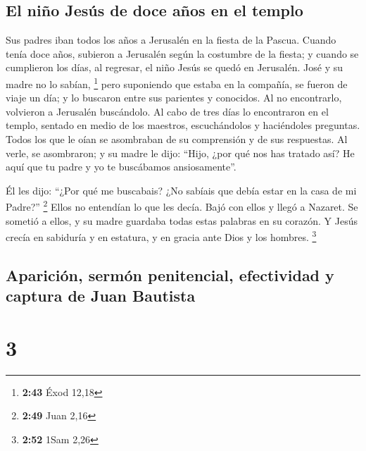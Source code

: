 \hypertarget{el-niuxf1o-jesuxfas-de-doce-auxf1os-en-el-templo}{%
\subsection{El niño Jesús de doce años en el
templo}\label{el-niuxf1o-jesuxfas-de-doce-auxf1os-en-el-templo}}

 Sus padres iban todos los años a Jerusalén en la fiesta
de la Pascua.  Cuando tenía doce años, subieron a
Jerusalén según la costumbre de la fiesta;  y cuando se
cumplieron los días, al regresar, el niño Jesús se quedó en Jerusalén.
José y su madre no lo sabían, \footnote{\textbf{2:43} Éxod 12,18}
 pero suponiendo que estaba en la compañía, se fueron de
viaje un día; y lo buscaron entre sus parientes y conocidos.
 Al no encontrarlo, volvieron a Jerusalén buscándolo.
 Al cabo de tres días lo encontraron en el templo,
sentado en medio de los maestros, escuchándolos y haciéndoles preguntas.
 Todos los que le oían se asombraban de su comprensión y
de sus respuestas.  Al verle, se asombraron; y su madre
le dijo: ``Hijo, ¿por qué nos has tratado así? He aquí que tu padre y yo
te buscábamos ansiosamente''.

 Él les dijo: ``¿Por qué me buscabais? ¿No sabíais que
debía estar en la casa de mi Padre?'' \footnote{\textbf{2:49} Juan 2,16}
 Ellos no entendían lo que les decía. 
Bajó con ellos y llegó a Nazaret. Se sometió a ellos, y su madre
guardaba todas estas palabras en su corazón.  Y Jesús
crecía en sabiduría y en estatura, y en gracia ante Dios y los hombres.
\footnote{\textbf{2:52} 1Sam 2,26}

\hypertarget{apariciuxf3n-sermuxf3n-penitencial-efectividad-y-captura-de-juan-bautista}{%
\subsection{Aparición, sermón penitencial, efectividad y captura de Juan
Bautista}\label{apariciuxf3n-sermuxf3n-penitencial-efectividad-y-captura-de-juan-bautista}}

\hypertarget{section-2}{%
\section{3}\label{section-2}}

